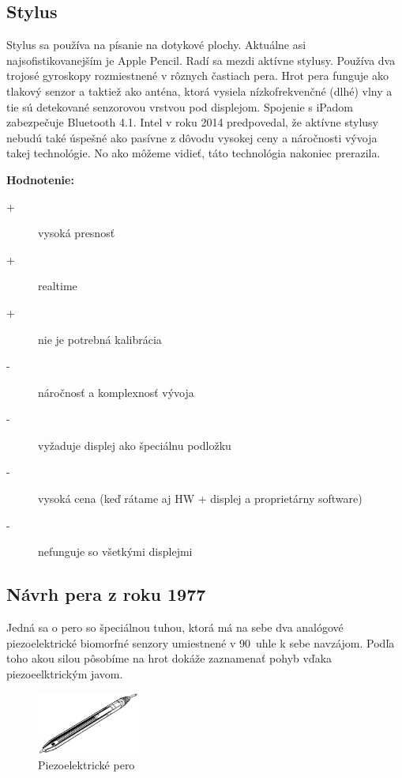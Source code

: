 \subsection*{Stylus}

Stylus sa používa na písanie na dotykové plochy. Aktuálne asi najsofistikovanejším je Apple Pencil. Radí sa mezdi aktívne stylusy\cite{HarleyJonahA2013As}. Používa dva trojosé gyroskopy rozmiestnené v rôznych častiach pera. Hrot pera funguje ako tlakový senzor a taktiež ako anténa, ktorá vysiela nízkofrekvenčné (dlhé) vlny a tie sú detekované senzorovou vrstvou pod displejom. Spojenie s iPadom zabezpečuje Bluetooth 4.1\cite{ApplePencilForum}. Intel v roku 2014 predpovedal, že aktívne stylusy nebudú také úspešné ako pasívne z dôvodu vysokej ceny a náročnosti vývoja takej technológie\cite{IntelDisp}. No ako môžeme vidieť, táto technológia nakoniec prerazila.\newline

\textbf{Hodnotenie:}
\begin{description}
	\item[+]{vysoká presnosť}
	\item[+]{realtime}
	\item[+]{nie je potrebná kalibrácia}
	\item[-]{náročnosť a komplexnosť vývoja}
	\item[-]{vyžaduje displej ako špeciálnu podložku}
	\item[-]{vysoká cena (keď rátame aj HW + displej a proprietárny software)}
	\item[-]{nefunguje so všetkými displejmi}
\end{description}

\subsection*{Návrh pera z roku 1977}

Jedná sa o pero so špeciálnou tuhou, ktorá má na sebe dva analógové piezoelektrické biomorfné senzory umiestnené v 90\degree~uhle k sebe navzájom. Podľa toho akou silou pôsobíme na hrot dokáže zaznamenať pohyb vďaka piezoeelktrickým javom.\cite{EernisseE}

\begin{figure}[hbt]
	\centering
	\includegraphics[width=0.3\textwidth]{obrazky-figures/piezoPen1997.png}
	\caption{Piezoelektrické pero}
	\label{piezoPen1997}
\end{figure}

